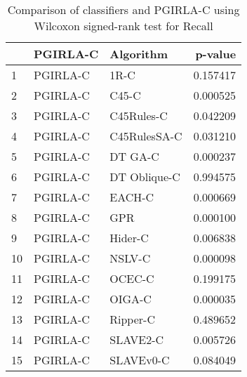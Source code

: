 \begin{table}
\footnotesize
\caption{Comparison of classifiers and PGIRLA-C using Wilcoxon signed-rank test for Recall}
\label{tab:PGIRLA-C wilcoxon Recall comparison}
\begin{tabular}{lllr}
\hline
 & PGIRLA-C & Algorithm & p-value \\
\hline
1 & PGIRLA-C & 1R-C & 0.157417 \\
2 & PGIRLA-C & C45-C & 0.000525 \\
3 & PGIRLA-C & C45Rules-C & 0.042209 \\
4 & PGIRLA-C & C45RulesSA-C & 0.031210 \\
5 & PGIRLA-C & DT GA-C & 0.000237 \\
6 & PGIRLA-C & DT Oblique-C & 0.994575 \\
7 & PGIRLA-C & EACH-C & 0.000669 \\
8 & PGIRLA-C & GPR & 0.000100 \\
9 & PGIRLA-C & Hider-C & 0.006838 \\
10 & PGIRLA-C & NSLV-C & 0.000098 \\
11 & PGIRLA-C & OCEC-C & 0.199175 \\
12 & PGIRLA-C & OIGA-C & 0.000035 \\
13 & PGIRLA-C & Ripper-C & 0.489652 \\
14 & PGIRLA-C & SLAVE2-C & 0.005726 \\
15 & PGIRLA-C & SLAVEv0-C & 0.084049 \\
\hline
\end{tabular}
\end{table}
